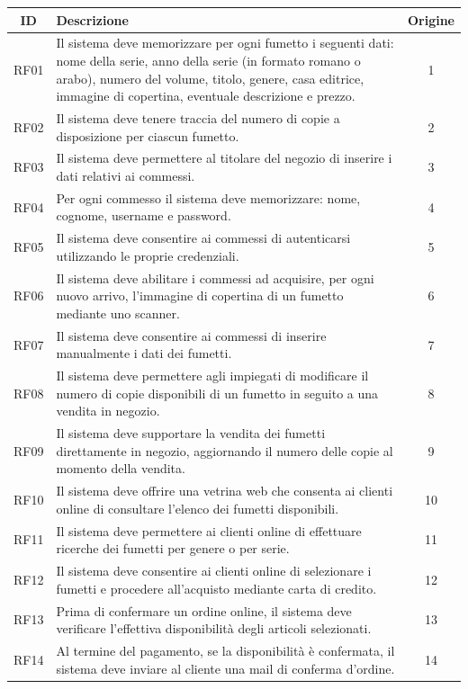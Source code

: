 \documentclass[12pt, a4paper]{article}
\begin{document}
\begin{longtable}{|c|>{\raggedright\arraybackslash}p{12cm}|c|}
\hline
\textbf{ID} & \textbf{Descrizione} & \textbf{Origine} \\
\hline

RF01 & Il sistema deve memorizzare per ogni fumetto i seguenti dati: nome della serie, anno della serie (in formato romano o arabo), numero del volume, titolo, genere, casa editrice, immagine di copertina, eventuale descrizione e prezzo. & 1 \\
\hline
RF02 & Il sistema deve tenere traccia del numero di copie a disposizione per ciascun fumetto. & 2 \\
\hline
RF03 & Il sistema deve permettere al titolare del negozio di inserire i dati relativi ai commessi. & 3 \\
\hline
RF04 & Per ogni commesso il sistema deve memorizzare: nome, cognome, username e password. & 4 \\
\hline
RF05 & Il sistema deve consentire ai commessi di autenticarsi utilizzando le proprie credenziali. & 5 \\
\hline
RF06 & Il sistema deve abilitare i commessi ad acquisire, per ogni nuovo arrivo, l’immagine di copertina di un fumetto mediante uno scanner. & 6 \\
\hline
RF07 & Il sistema deve consentire ai commessi di inserire manualmente i dati dei fumetti. & 7 \\
\hline
RF08 & Il sistema deve permettere agli impiegati di modificare il numero di copie disponibili di un fumetto in seguito a una vendita in negozio. & 8 \\
\hline
RF09 & Il sistema deve supportare la vendita dei fumetti direttamente in negozio, aggiornando il numero delle copie al momento della vendita. & 9 \\
\hline
RF10 & Il sistema deve offrire una vetrina web che consenta ai clienti online di consultare l’elenco dei fumetti disponibili. & 10 \\
\hline
RF11 & Il sistema deve permettere ai clienti online di effettuare ricerche dei fumetti per genere o per serie. & 11 \\
\hline
RF12 & Il sistema deve consentire ai clienti online di selezionare i fumetti e procedere all’acquisto mediante carta di credito. & 12 \\
\hline
RF13 & Prima di confermare un ordine online, il sistema deve verificare l’effettiva disponibilità degli articoli selezionati. & 13 \\
\hline
RF14 & Al termine del pagamento, se la disponibilità è confermata, il sistema deve inviare al cliente una mail di conferma d’ordine. & 14 \\

\end{longtable}
\end{document}
